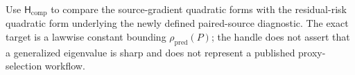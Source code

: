 Use \(\mathsf H_{\mathrm{comp}}\) to compare the source-gradient quadratic forms with the residual-risk quadratic form underlying the newly defined paired-source diagnostic. The exact target is a lawwise constant bounding \(\rho_{\mathrm{pred}}(P)\); the handle does not assert that a generalized eigenvalue is sharp and does not represent a published proxy-selection workflow.